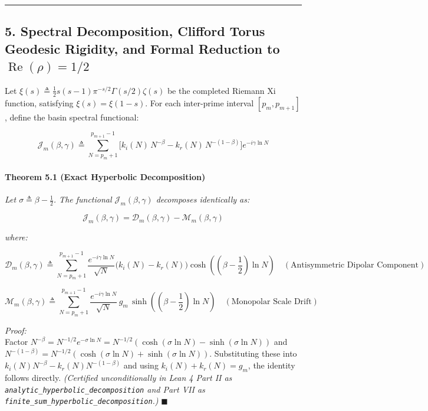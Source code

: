 \documentclass[
  11pt,
]{article}
\begin{document}
\begin{center}\rule{0.5\linewidth}{0.5pt}\end{center}

\subsection{\texorpdfstring{5. Spectral Decomposition, Clifford Torus
Geodesic Rigidity, and Formal Reduction to
\(\operatorname{Re}(\rho) = 1/2\)}{5. Spectral Decomposition, Clifford Torus Geodesic Rigidity, and Formal Reduction to \textbackslash operatorname\{Re\}(\textbackslash rho) = 1/2}}\label{spectral-decomposition-clifford-torus-geodesic-rigidity-and-formal-reduction-to-operatornamererho-12}

Let \(\xi(s) \triangleq \frac{1}{2}s(s-1)\pi^{-s/2}\Gamma(s/2)\zeta(s)\)
be the completed Riemann Xi function, satisfying \(\xi(s) = \xi(1-s)\).
For each inter-prime interval \([p_m, p_{m+1}]\), define the basin
spectral functional:

\[\mathcal{J}_m(\beta, \gamma) \triangleq \sum_{N = p_m + 1}^{p_{m+1} - 1} \Big[ k_i(N) \, N^{-\beta} - k_r(N) \, N^{-(1-\beta)} \Big] e^{-i\gamma \ln N}\]

\paragraph{Theorem 5.1 (Exact Hyperbolic
Decomposition)}\label{theorem-5.1-exact-hyperbolic-decomposition}

\emph{Let \(\sigma \triangleq \beta - \frac{1}{2}\). The functional
\(\mathcal{J}_m(\beta, \gamma)\) decomposes identically as:}

\[\mathcal{J}_m(\beta, \gamma) = \mathcal{D}_m(\beta, \gamma) - \mathcal{M}_m(\beta, \gamma)\]

\emph{where:}

\[\mathcal{D}_m(\beta, \gamma) \triangleq \sum_{N = p_m + 1}^{p_{m+1} - 1} \frac{e^{-i\gamma \ln N}}{\sqrt{N}} \big(k_i(N) - k_r(N)\big) \cosh\left(\left(\beta - \frac{1}{2}\right)\ln N\right) \quad (\text{Antisymmetric Dipolar Component})\]

\[\mathcal{M}_m(\beta, \gamma) \triangleq \sum_{N = p_m + 1}^{p_{m+1} - 1} \frac{e^{-i\gamma \ln N}}{\sqrt{N}} \, g_m \, \sinh\left(\left(\beta - \frac{1}{2}\right)\ln N\right) \quad (\text{Monopolar Scale Drift})\]

\emph{Proof:}\\
Factor
\(N^{-\beta} = N^{-1/2} e^{-\sigma \ln N} = N^{-1/2}(\cosh(\sigma \ln N) - \sinh(\sigma \ln N))\)
and
\(N^{-(1-\beta)} = N^{-1/2}(\cosh(\sigma \ln N) + \sinh(\sigma \ln N))\).
Substituting these into \(k_i(N) N^{-\beta} - k_r(N) N^{-(1-\beta)}\)
and using \(k_i(N) + k_r(N) = g_m\), the identity follows directly.
\emph{(Certified unconditionally in Lean 4 Part II as
\texttt{analytic\_hyperbolic\_decomposition} and Part VII as
\texttt{finite\_sum\_hyperbolic\_decomposition}.)} \(\blacksquare\)
\end{document}
